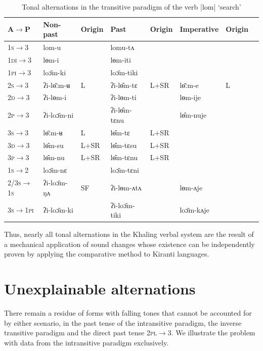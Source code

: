 \documentclass[oldfontcommands,oneside,a4paper,11pt]{article}
\newcommand{\ipa}[1]{{\phon \mbox{#1}}} %
\begin{document}
\begin{table}[H]
\caption{Tonal alternations in the transitive paradigm of the verb |lom| `search' } \label{tab:trans.paradigm3} \centering
\begin{tabular}{llllllll}
\toprule
A$\rightarrow$P& Non-past & Origin & Past & Origin& Imperative& Origin\\
\midrule
\textsc{1s}$\rightarrow$3 & \ipa{lom-u} & & \ipa{lomu-tʌ} &  &  \\
\textsc{1di}$\rightarrow$3 & \ipa{lɵm-i} &  & \ipa{lɵm-iti}  & \\
\textsc{1pi}$\rightarrow$3 & \ipa{loɔ̄m-ki} &  & \ipa{loɔ̄m-tiki} \\
\textsc{2s}$\rightarrow$3 & \ipa{ʔi-lɵ̄ːm-ʉ} & L  & \ipa{ʔi-lɵ̂m-tɛ} &L+SR  &\ipa{lɵ̄ːm-e} & L\\
\textsc{2d}$\rightarrow$3 & \ipa{ʔi-lɵm-i} & &  \ipa{ʔi-lɵm-ti} & & \ipa{lɵm-ije} & \\
\textsc{2p}$\rightarrow$3 & \ipa{ʔi-loɔ̄m-ni} &  & \ipa{ʔi-lɵ̂m-tɛnu} &  &\ipa{lɵ̂m-nuje} &\\
\textsc{3s}$\rightarrow$3 & \ipa{lɵ̄ːm-ʉ} & L &\ipa{lɵ̂m-tɛ} & L+SR\\
\textsc{3d}$\rightarrow$3 & \ipa{lɵ̂m-su} &L+SR& \ipa{lɵ̂m-tɛsu}   & L+SR\\
\textsc{3p}$\rightarrow$3 & \ipa{lɵ̂m-nu} & L+SR& \ipa{lɵ̂m-tɛnu} & L+SR\\
\midrule
\textsc{1s}$\rightarrow$2 & \ipa{loɔ̄m-nɛ} & & \ipa{loɔ̄m-tɛni} & \\
\textsc{2/3s$\rightarrow$1s} & \ipa{ʔi-loɔ̄m-ŋʌ} &SF &\ipa{ʔi-lɵm-ʌtʌ} & &\ipa{lɵm-ʌje}\\
\textsc{3s$\rightarrow$1pi} & \ipa{ʔi-loɔ̄m-ki} & &\ipa{ʔi-loɔ̄m-tiki} & &\ipa{loɔ̄m-kʌje}\\
\bottomrule
\end{tabular}
\end{table}


Thus, nearly all tonal alternations in the Khaling verbal system are the result of a mechanical application of sound changes whose existence can be independently proven by applying the comparative method to Kiranti languages.

\section{Unexplainable alternations}

There remain a residue of forms with falling tones that cannot be accounted for by either scenario, in the past tense of the intransitive paradigm, the  inverse transitive paradigm and the direct past tense \textsc{2pl$\rightarrow$3}. We illustrate the problem with data from the intransitive paradigm exclusively.
\end{document}
